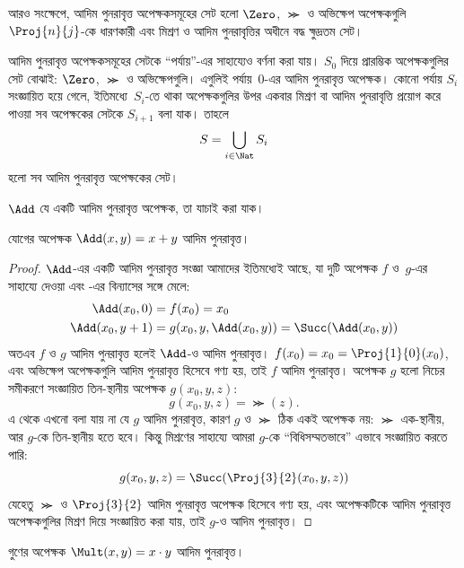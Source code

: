 \documentclass[../../../include/open-logic-section]{subfiles}
\begin{document}
\begin{explain}
আরও সংক্ষেপে, আদিম পুনরাবৃত্ত অপেক্ষকসমূহের সেট হলো $\Zero$, $\Succ$
ও অভিক্ষেপ অপেক্ষকগুলি~$\Proj{n}{j}$-কে ধারণকারী এবং মিশ্রণ ও আদিম
পুনরাবৃত্তির অধীনে বদ্ধ ক্ষুদ্রতম সেট।

আদিম পুনরাবৃত্ত অপেক্ষকসমূহের সেটকে “পর্যায়”-এর সাহায্যেও বর্ণনা করা
যায়। $S_0$ দিয়ে প্রারম্ভিক অপেক্ষকগুলির সেট বোঝাই: $\Zero$, $\Succ$
ও অভিক্ষেপগুলি। এগুলিই পর্যায়~$0$-এর আদিম পুনরাবৃত্ত অপেক্ষক। কোনো
পর্যায় $S_i$ সংজ্ঞায়িত হয়ে গেলে, ইতিমধ্যে~$S_i$-তে থাকা অপেক্ষকগুলির
উপর একবার মিশ্রণ বা আদিম পুনরাবৃত্তি প্রয়োগ করে পাওয়া সব অপেক্ষকের
সেটকে $S_{i+1}$ বলা যাক। তাহলে
\[
S = \bigcup_{i \in \Nat} S_i
\]
হলো সব আদিম পুনরাবৃত্ত অপেক্ষকের সেট।
\end{explain}

$\Add$ যে একটি আদিম পুনরাবৃত্ত অপেক্ষক, তা যাচাই করা যাক।

\begin{prop}
  যোগের অপেক্ষক $\Add(x,y) = x+y$ আদিম পুনরাবৃত্ত।
\end{prop}

\begin{proof}
$\Add$-এর একটি আদিম পুনরাবৃত্ত সংজ্ঞা আমাদের ইতিমধ্যেই আছে, যা দুটি
অপেক্ষক $f$ ও~$g$-এর সাহায্যে দেওয়া এবং
-এর বিন্যাসের সঙ্গে মেলে:
\begin{align*}
  \Add(x_0, 0) & = f(x_0) = x_0\\
  \Add(x_0, y+1) & = g(x_0, y, \Add(x_0, y)) =
  \Succ(\Add(x_0, y))
\end{align*}
অতএব $f$ ও $g$ আদিম পুনরাবৃত্ত হলেই $\Add$-ও আদিম পুনরাবৃত্ত।
$f(x_0) = x_0 = \Proj{1}{0}(x_0)$, এবং অভিক্ষেপ অপেক্ষকগুলি আদিম
পুনরাবৃত্ত হিসেবে গণ্য হয়, তাই $f$ আদিম পুনরাবৃত্ত। অপেক্ষক $g$ হলো
নিচের সমীকরণে সংজ্ঞায়িত তিন-স্থানীয় অপেক্ষক $g(x_0, y, z)$:
\[
g(x_0, y, z) = \Succ(z).
\]
এ থেকে এখনো বলা যায় না যে $g$ আদিম পুনরাবৃত্ত, কারণ $g$ ও $\Succ$
ঠিক একই অপেক্ষক নয়: $\Succ$ এক-স্থানীয়, আর $g$-কে তিন-স্থানীয় হতে
হবে। কিন্তু মিশ্রণের সাহায্যে আমরা $g$-কে “বিধিসম্মতভাবে” এভাবে
সংজ্ঞায়িত করতে পারি:
\[
g(x_0, y, z) = \Succ(\Proj{3}{2}(x_0, y, z))
\]
যেহেতু $\Succ$ ও $\Proj{3}{2}$ আদিম পুনরাবৃত্ত অপেক্ষক হিসেবে গণ্য হয়,
এবং অপেক্ষকটিকে আদিম পুনরাবৃত্ত অপেক্ষকগুলির মিশ্রণ দিয়ে সংজ্ঞায়িত করা যায়,
তাই $g$-ও আদিম পুনরাবৃত্ত।
\end{proof}

\begin{prop}
  গুণের অপেক্ষক $\Mult(x,y) = x \cdot y$ আদিম পুনরাবৃত্ত।
\end{prop}
\end{document}
